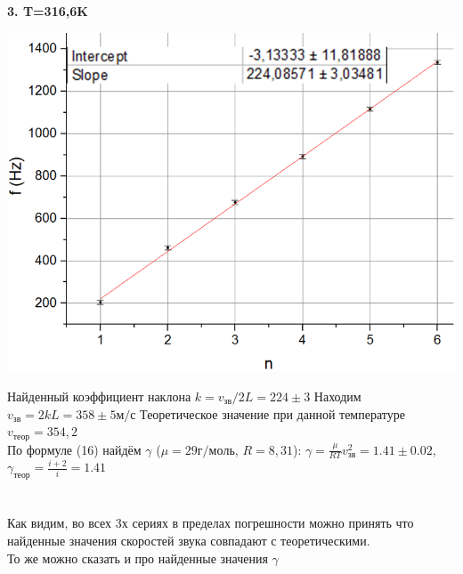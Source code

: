 \documentclass[12pt]{article}
\begin{document}
    \textbf{3. T=316,6K}
    \begin{center}
    	\includegraphics[width=14cm]{graph40.png}
    \end{center}
    Найденный коэффициент наклона $k = v_{зв}/2L = 224 \pm 3$
    Находим $v_{зв} = 2kL = 358 \pm 5 м/с$
    Теоретическое значение при данной температуре $v_{теор} = 354,2$\\
    По формуле (16) найдём $\gamma$ ($\mu = 29 г/моль$, $R=8,31$):
    $\gamma = \frac{\mu}{RT}v_{зв}^2 = 1.41 \pm 0.02$, $\gamma_{теор} = \frac{i+2}{i} = 1.41$
    \\ \\ \\
    Как видим, во всех 3х сериях в пределах погрешности можно принять что найденные значения скоростей звука совпадают с теоретическими.\\
    То же можно сказать и про найденные значения $\gamma$
    
\end{document}
